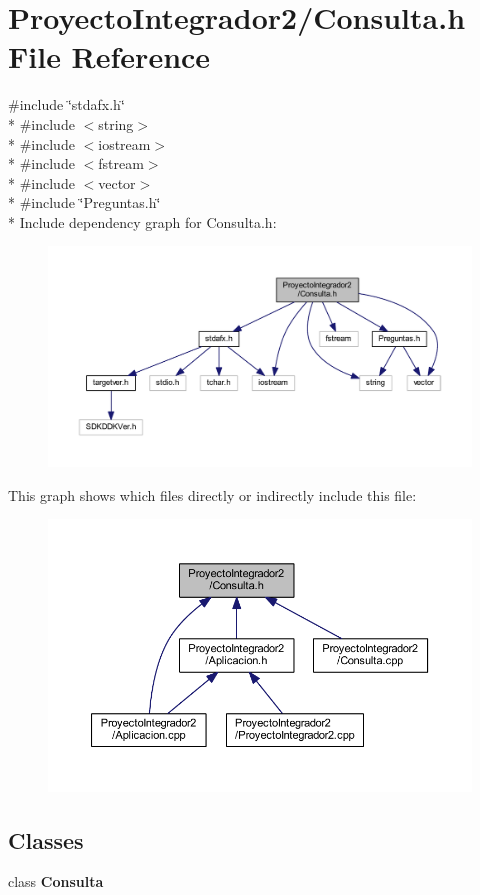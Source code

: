 \section{Proyecto\-Integrador2/\-Consulta.h File Reference}
\label{_consulta_8h}
{\ttfamily \#include \char`\"{}stdafx.\-h\char`\"{}}\\*
{\ttfamily \#include $<$string$>$}\\*
{\ttfamily \#include $<$iostream$>$}\\*
{\ttfamily \#include $<$fstream$>$}\\*
{\ttfamily \#include $<$vector$>$}\\*
{\ttfamily \#include \char`\"{}Preguntas.\-h\char`\"{}}\\*
Include dependency graph for Consulta.\-h\-:\nopagebreak
\begin{figure}[H]
\begin{center}
\leavevmode
\includegraphics[width=350pt]{_consulta_8h__incl}
\end{center}
\end{figure}
This graph shows which files directly or indirectly include this file\-:\nopagebreak
\begin{figure}[H]
\begin{center}
\leavevmode
\includegraphics[width=350pt]{_consulta_8h__dep__incl}
\end{center}
\end{figure}
\subsection*{Classes}
\begin{DoxyCompactItemize}
\item 
class {\bf Consulta}
\end{DoxyCompactItemize}
